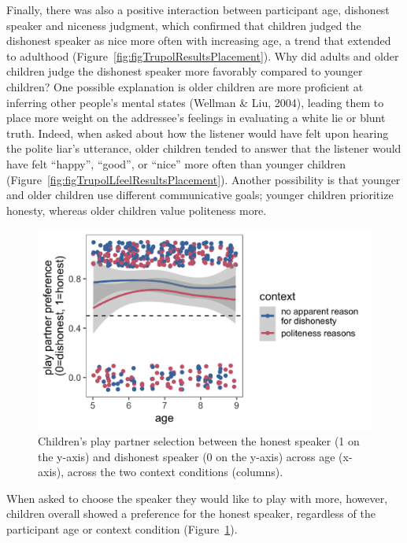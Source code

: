 \documentclass[oneside]{report}
\begin{document}
Finally, there was also a positive interaction between participant age,
dishonest speaker and niceness judgment, which confirmed that children
judged the dishonest speaker as nice more often with increasing age, a
trend that extended to adulthood
(Figure~\ref{fig:figTrupolResultsPlacement}). Why did adults and older
children judge the dishonest speaker more favorably compared to younger
children? One possible explanation is older children are more proficient
at inferring other people's mental states (Wellman \& Liu, 2004),
leading them to place more weight on the addressee's feelings in
evaluating a white lie or blunt truth. Indeed, when asked about how the
listener would have felt upon hearing the polite liar's utterance, older
children tended to answer that the listener would have felt ``happy'',
``good'', or ``nice'' more often than younger children
(Figure~\ref{fig:figTrupolLfeelResultsPlacement}). Another possibility
is that younger and older children use different communicative goals;
younger children prioritize honesty, whereas older children value
politeness more.
\begin{figure}[t]

{\centering \includegraphics[width=0.9\linewidth]{erica_yoon_dissertation_files/figure-latex/figTrupolPlayPlacement-1} 

}

\caption[Play partner selection in the experiment in Chapter 3.]{Children's play partner selection between the honest speaker (1 on the y-axis) and dishonest speaker (0 on the y-axis) across age (x-axis), across the two context conditions (columns).}\label{fig:figTrupolPlayPlacement}
\end{figure}
When asked to choose the speaker they would like to play with more,
however, children overall showed a preference for the honest speaker,
regardless of the participant age or context condition
(Figure~\ref{fig:figTrupolPlayPlacement}).
\end{document}

